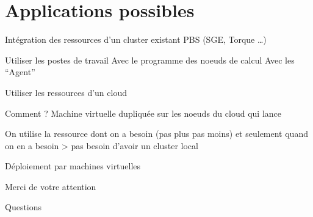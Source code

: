 \documentclass[handout]{beamer}
\begin{document}
\section[Applications]{Applications possibles}
\begin{frame}
	\tableofcontents[currentsection]
\end{frame}
\begin{frame}{Intégration des ressources d'un cluster existant}
    PBS (SGE, Torque \ldots)
\end{frame}
\begin{frame}{Utiliser les postes de travail}
    Avec le programme des noeuds de calcul
    Avec les ``Agent''
\end{frame}
\begin{frame}{Utiliser les ressources d'un cloud}
    \begin{exampleblock}{Comment ?}
        Machine virtuelle dupliquée sur les noeuds du cloud qui lance 
    \end{exampleblock}
    
     On utilise la ressource dont on a besoin (pas plus pas moins) et seulement quand on en a besoin
     > pas besoin d'avoir un cluster local

     Déploiement par machines virtuelles
\end{frame}


\begin{frame}
	\begin{center}	{\huge Merci de votre attention}\end{center}
	\end{frame}
\begin{frame}
	\begin{center}	{\huge Questions}\end{center}
	\end{frame}
\end{document}
